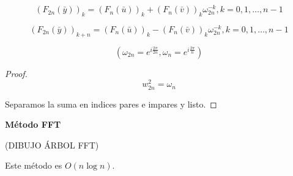 			\[ \left(F_{2n} (\bar{y})\right)_k = \left(F_{n} (\bar{u})\right)_k + \left(F_{n} (\bar{v})\right)_k \omega_{2n}^{-k}, k=0,1,…,n-1 \]

			\[ \left(F_{2n} (\bar{y})\right)_{k+n} = \left(F_{n} (\bar{u})\right)_k - \left(F_{n} (\bar{v})\right)_k \omega_{2n}^{-k}, k=0,1,…,n-1 \]

			\[ (\omega_{2n} = e^{i\frac{2\pi}{2n}}, \omega_{n} = e^{i \frac{2\pi}{n}})  \]

			\begin{proof}

				\[ w_{2n}^2 = \omega_{n} \]

				Separamos la suma en indices pares e impares y listo.

			\end{proof}

			\textbf{Método FFT}

			(DIBUJO ÁRBOL FFT)

			Este método es $O(n \log n)$.









